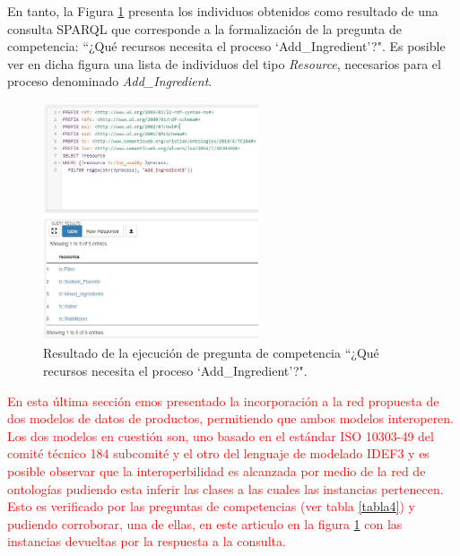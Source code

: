 \documentclass[journal]{IEEEtran}
\begin{document}
En tanto, la Figura \ref{fig13} presenta los individuos obtenidos como resultado de una consulta SPARQL que corresponde a la formalizaci\'on de la pregunta de competencia: ``¿Qu\'e recursos necesita el proceso ‘Add\_Ingredient’?". Es posible ver en dicha figura una lista de individuos del tipo \emph{Resource}, necesarios para el proceso denominado \emph{Add\_Ingredient}.

\begin{figure}[!t]
\centering
\includegraphics[width=2.5in]{figures/figure13.jpg}
\caption{Resultado de la ejecuci\'on de pregunta de competencia ``¿Qu\'e recursos necesita el proceso ‘Add\_Ingredient’?".}
\label{fig13}
\end{figure}


\textcolor{red}{En esta \'ultima secci\'on emos presentado la incorporación a la red propuesta de dos modelos de datos de productos, permitiendo que ambos modelos interoperen. Los dos modelos en cuestión son, uno basado en el est\'andar ISO 10303-49 del comit\'e t\'ecnico 184 subcomit\'e y el otro del lenguaje de modelado IDEF3 y es posible observar que  la interoperbilidad es alcanzada por medio de la red de ontolog\'ias pudiendo esta inferir las clases a las cuales las instancias pertenecen. Esto es verificado por las preguntas de competencias (ver tabla \ref{tabla4}) y pudiendo corroborar, una de ellas, en este articulo en la figura \ref{fig13} con las instancias devueltas por la respuesta a la consulta.}

%
%
\end{document}
